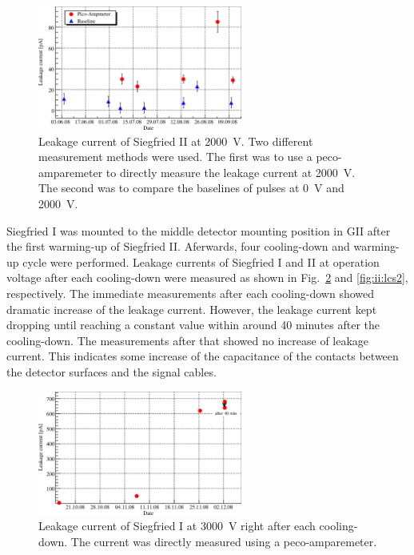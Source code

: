 \begin{figure}[htbp]
\centering
\includegraphics[width=0.6\textwidth, clip]{LC}
\caption{Leakage current of Siegfried II at 2000~V. Two different measurement methods were used. The first was to use a peco-amparemeter to directly measure the leakage current at 2000~V. The second was to compare the baselines of pulses at 0~V and 2000~V.}
\label{fig:ii:lc}
\end{figure}

Siegfried I was mounted to the middle detector mounting position in GII after the first warming-up of Siegfried II. Aferwards, four cooling-down and warming-up cycle were performed. Leakage currents of Siegfried I and II at operation voltage after each cooling-down were measured as shown in Fig.~\ref{fig:ii:lcs1} and \ref{fig:ii:lcs2}, respectively. The immediate measurements after each cooling-down showed dramatic increase of the leakage current. However, the leakage current kept dropping until reaching a constant value within around 40 minutes after the cooling-down. The measurements after that showed no increase of leakage current. This indicates some increase of the capacitance of the contacts between the detector surfaces and the signal cables.

\begin{figure}[htbp]
\centering
\includegraphics[width=0.6\textwidth]{LCs1}
\caption{Leakage current of Siegfried I at 3000~V right after each cooling-down. The current was directly measured using a peco-amparemeter.}
\label{fig:ii:lcs1}
\end{figure}

